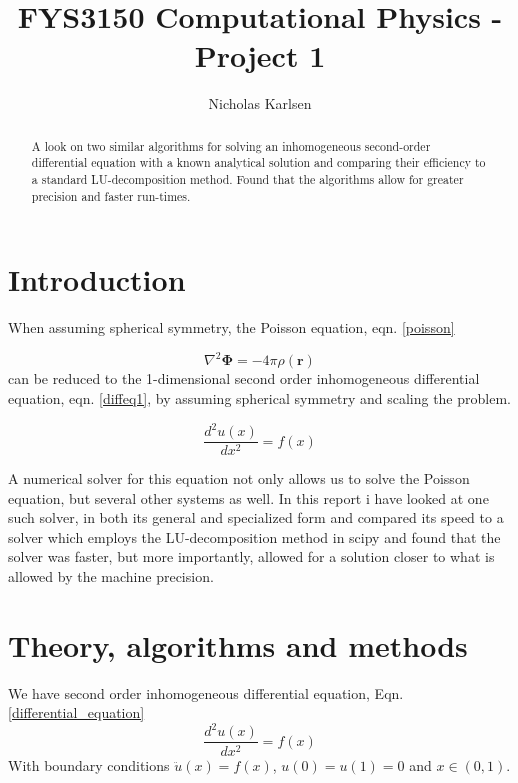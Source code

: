 \documentclass[10pt,showpacs,preprintnumbers,footinbib,amsmath,amssymb,aps,prl,twocolumn,groupedaddress,superscriptaddress,showkeys]{revtex4-1}
\begin{document}
\title{FYS3150 Computational Physics - Project 1}
\author{Nicholas Karlsen}

\begin{abstract}
  A look on two similar algorithms for solving an inhomogeneous second-order differential equation with a known analytical solution and comparing their efficiency to a standard LU-decomposition method. Found that the algorithms allow for greater precision and faster run-times.
\end{abstract}

\maketitle

\section{Introduction}
  When assuming spherical symmetry, the Poisson equation, eqn. \ref{poisson}

  \begin{equation}
    \label{poisson}
    \nabla^2 \mathbf \Phi = - 4\pi \rho (\mathbf r)
  \end{equation}
  can be reduced to the 1-dimensional second order inhomogeneous differential equation, eqn. \ref{diffeq1},
  by assuming spherical symmetry and scaling the problem.

  \begin{equation}
    \label{diffeq1}
    \frac{d^2u(x)}{dx^2} = f(x)
  \end{equation}

  A numerical solver for this equation not only allows us to solve the Poisson equation, but several other systems as well. In this report i have looked at one such solver, in both its general and specialized form and compared its speed to a solver which employs the LU-decomposition method in scipy and found that the solver was faster, but more importantly, allowed for a solution closer to what is allowed by the machine precision.


\section{Theory, algorithms and methods}
We have second order inhomogeneous differential equation, Eqn. \ref{differential_equation}
  \begin{equation}
    \label{differential_equation}
    \frac{d^2u(x)}{dx^2} = f(x)
  \end{equation}
  With boundary conditions $\ddot{u}(x) = f(x)$, $u(0) = u(1) = 0$ and $x \in (0, 1)$.
\end{document}
